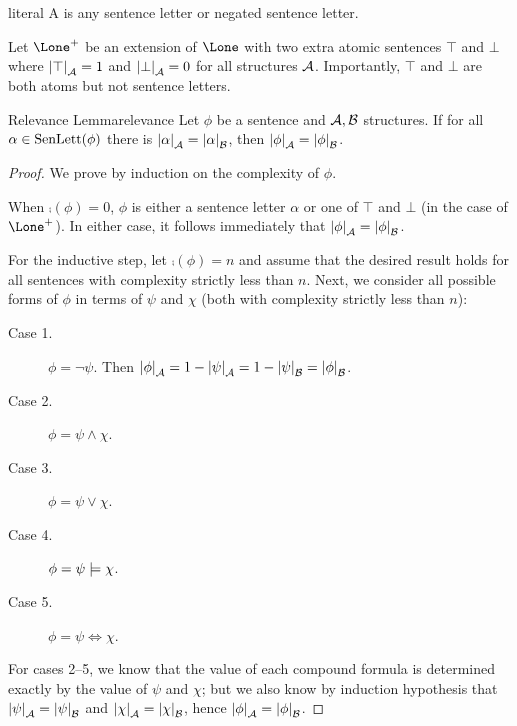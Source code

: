 \documentclass{styles/tufte}
\begin{document}
\begin{definition}{}{literal}
  A  is any sentence letter or negated sentence letter.
\end{definition}

\begin{definition}{}{}
  Let $\Lone^+$ be an extension of $\Lone$ with two extra atomic sentences $\top$ and $\bot$ where $\valunder{\top}{A} = 1$ and $\valunder{\bot}{A} = 0$ for all structures $\mathcal{A}$. Importantly, $\top$ and $\bot$ are both atoms but not sentence letters.
\end{definition}

\begin{lemma}{Relevance Lemma}{relevance}
  Let $\phi$ be a sentence and $\mathcal{A}, \mathcal{B}$ structures. If for all $\alpha \in \operatorname{SenLett}(\phi)$ there is $\valunder{\alpha}{A} = \valunder{\alpha}{B}$, then $\valunder{\phi}{A} = \valunder{\phi}{B}$.
\end{lemma}

\begin{proof}
  We prove by induction on the complexity of $\phi$.
  
  When $\comp(\phi) = 0$, $\phi$ is either a sentence letter $\alpha$ or one of $\top$ and $\bot$ (in the case of $\Lone^+$). In either case, it follows immediately that $\valunder{\phi}{A} = \valunder{\phi}{B}$.
  
  For the inductive step, let $\comp(\phi) = n$ and assume that the desired result holds for all sentences with complexity strictly less than $n$. Next, we consider all possible forms of $\phi$ in terms of $\psi$ and $\chi$ (both with complexity strictly less than $n$):
  \begin{description}
    \item[Case 1.] $\phi = \neg \psi$. Then $\valunder{\phi}{A} = 1 - \valunder{\psi}{A} = 1 - \valunder{\psi}{B} = \valunder{\phi}{B}$.
    \item[Case 2.] $\phi = \psi \land \chi$.
    \item[Case 3.] $\phi = \psi \lor \chi$.
    \item[Case 4.] $\phi = \psi \entails \chi$.
    \item[Case 5.] $\phi = \psi \iff \chi$.
  \end{description}
  For cases 2--5, we know that the value of each compound formula is determined exactly by the value of $\psi$ and $\chi$; but we also know by induction hypothesis that $\valunder{\psi}{A} = \valunder{\psi}{B}$ and $\valunder{\chi}{A} = \valunder{\chi}{B}$, hence $\valunder{\phi}{A} = \valunder{\phi}{B}$.
\end{proof}
\end{document}
